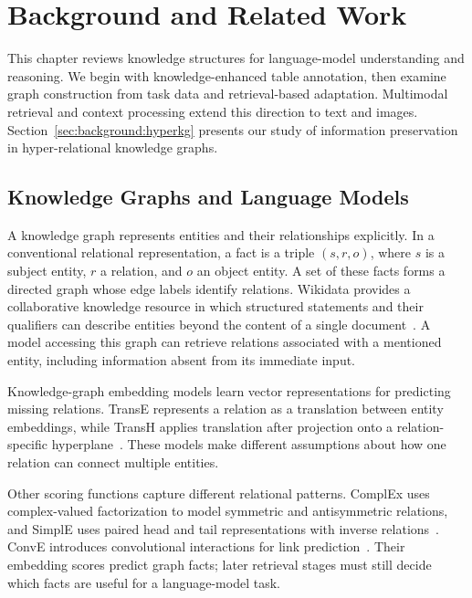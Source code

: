 \chapter{Background and Related Work}
\label{ch:background}

This chapter reviews knowledge structures for language-model understanding and reasoning. We begin with knowledge-enhanced table annotation, then examine graph construction from task data and retrieval-based adaptation. Multimodal retrieval and context processing extend this direction to text and images. Section~\ref{sec:background:hyperkg} presents our study of information preservation in hyper-relational knowledge graphs.

\section{Knowledge Graphs and Language Models}
\label{sec:background:knowledge-models}

A knowledge graph represents entities and their relationships explicitly. In a conventional relational representation, a fact is a triple $(s,r,o)$, where $s$ is a subject entity, $r$ a relation, and $o$ an object entity. A set of these facts forms a directed graph whose edge labels identify relations. Wikidata provides a collaborative knowledge resource in which structured statements and their qualifiers can describe entities beyond the content of a single document~\cite{bg-wikidata}. A model accessing this graph can retrieve relations associated with a mentioned entity, including information absent from its immediate input.

Knowledge-graph embedding models learn vector representations for predicting missing relations. TransE represents a relation as a translation between entity embeddings, while TransH applies translation after projection onto a relation-specific hyperplane~\cite{lit-bordes2013translating,lit-wang2014knowledge}. These models make different assumptions about how one relation can connect multiple entities.

Other scoring functions capture different relational patterns. ComplEx uses complex-valued factorization to model symmetric and antisymmetric relations, and SimplE uses paired head and tail representations with inverse relations~\cite{lit-trouillon2016complex,lit-kazemi2018simple}. ConvE introduces convolutional interactions for link prediction~\cite{lit-dettmers2018convolutional}. Their embedding scores predict graph facts; later retrieval stages must still decide which facts are useful for a language-model task.

